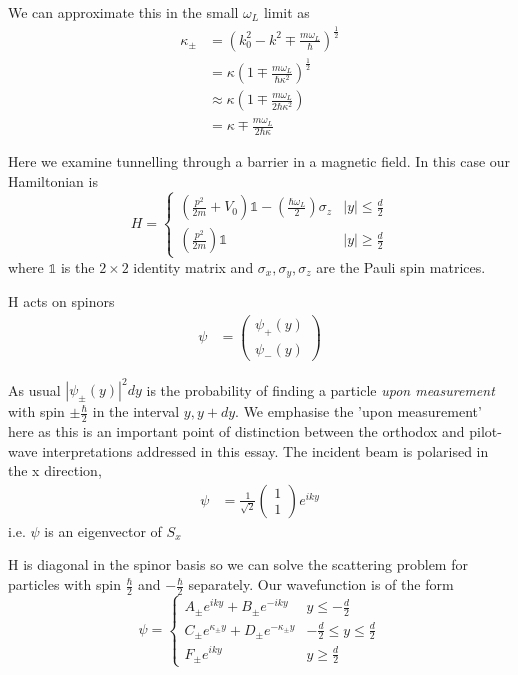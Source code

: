 \documentclass{article}
\begin{document}
We can approximate this in the small $\omega_L$ limit as
	\begin{align*}
		\kappa_{\pm} &= \left(k^{2}_{0}-k^{2} \mp \frac{m \omega_{L}}{\hbar}\right)^{\frac{1}{2}}\\	
			     &= \kappa \left(1 \mp \frac{m \omega_{L}}{\hbar \kappa^{2}}\right)^{\frac{1}{2}}\\
			     &\approx \kappa \left(1 \mp \frac{m \omega_{L}}{2\hbar \kappa^{2}}\right)\\
			      &= \kappa \mp \frac{m \omega_{L}}{2\hbar \kappa}
	\end{align*}

Here we examine tunnelling through a barrier in a magnetic field. In this case our Hamiltonian is
\begin{equation}
	H = 
	\begin{cases}
	\left(\frac{p^2}{2m} + V_0\right)\mathbb{1}-\left(\frac{\hbar \omega_L}{2}\right) \sigma_z & |y| \leq \frac{d}{2}\\
	\left(\frac{p^2}{2m}\right)\mathbb{1} & |y| \geq \frac{d}{2}
	\end{cases}
	\end{equation}
where $\mathbb{1}$ is the $2 \times 2$ identity matrix and $\sigma_{x}, \sigma_{y}, \sigma_{z}$ are the Pauli spin matrices.

H acts on spinors
\begin{align}
	\psi &= \begin{pmatrix}
		\psi_{+}(y) \\
		\psi_{-}(y)
		\end{pmatrix}
\end{align}

As usual $|\psi_{\pm}(y)|^{2}dy$ is the probability of finding a particle \textit{upon measurement} with spin $\pm \frac{\hbar}{2}$ in the interval $y, y+dy$. We emphasise the 'upon measurement' here as this is an important point of distinction between the orthodox and pilot-wave interpretations addressed in this essay. The incident beam is polarised in the x direction,
\begin{align}
	\psi &= \frac{1}{\sqrt{2}}
	\begin{pmatrix}
	1\\
	1
	\end{pmatrix}
	e^{i k y}
\end{align}
i.e. $\psi$ is an eigenvector of $S_{x}$

H is diagonal in the spinor basis so we can solve the scattering problem for particles with spin $\frac{\hbar}{2}$ and $-\frac{\hbar}{2}$ separately. 
Our wavefunction is of the form
\begin{equation}
	\psi = 
	\begin{cases}
		A_{\pm}e^{i k y} + B_{\pm}e^{-i k y} & y \leq -\frac{d}{2} \\
		C_{\pm}e^{\kappa_{\pm}y} + D_{\pm}e^{-\kappa_{\pm}y} & -\frac{d}{2} \leq y \leq \frac{d}{2} \\
		F_{\pm}e^{i k y} & y \geq \frac{d}{2}
	\end{cases}
\end{equation}
\end{document}
